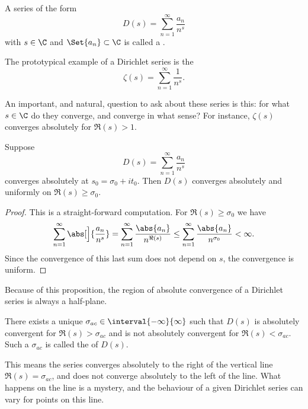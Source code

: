 
\begin{definition}
	A series of the form
	\[
		D(s) = \sum_{n = 1}^\infty \frac{a_n}{n^s}
	\]
	with $s \in \C$ and $\Set{a_n} \subset \C$ is called a .
\end{definition}

\begin{example}
	The prototypical example of a Dirichlet series is the 
	\[
		\zeta(s) = \sum_{n = 1}^\infty \frac{1}{n^s}.
	\]
\end{example}

An important, and natural, question to ask about these series is this: for what $s \in \C$ do they converge, and converge in what sense?
For instance, $\zeta(s)$ converges absolutely for $\Re(s) > 1$.

\begin{proposition}\label{prop12.1}
	Suppose
	\[
		D(s) = \sum_{n = 1}^\infty \frac{a_n}{n^s}
	\]
	converges absolutely at $s_0 = \sigma_0 + i t_0$.
	Then $D(s)$ converges absolutely and uniformly on $\Re(s) \geq \sigma_0$.
\end{proposition}

\begin{proof}
	This is a straight-forward computation.
	For $\Re(s) \geq \sigma_0$ we have
	\[
		\sum_{n = 1}^\infty \abs[\Big]{\frac{a_n}{n^s}} = \sum_{n = 1}^\infty \frac{\abs{a_n}}{n^{\Re(s)}} \leq \sum_{n = 1}^\infty \frac{\abs{a_n}}{n^{\sigma_0}} < \infty.
	\]
	Since the convergence of this last sum does not depend on $s$, the convergence is uniform.
\end{proof}

\begin{remark}
	\begin{items}
		\item Because of this proposition, the region of absolute convergence of a Dirichlet series is always a half-plane.
		\item There exists a unique $\sigma_{ac} \in \interval{-\infty}{\infty}$ such that $D(s)$ is absolutely convergent for $\Re(s) > \sigma_{ac}$ and is not absolutely convergent for $\Re(s) < \sigma_{ac}$.
		Such a $\sigma_{ac}$ is called the  of $D(s)$.

		This means the series converges absolutely to the right of the vertical line $\Re(s) = \sigma_{ac}$, and does not converge absolutely to the left of the line.
		What happens on the line is a mystery, and the behaviour of a given Dirichlet series can vary for points on this line.
	\end{items}
\end{remark}

